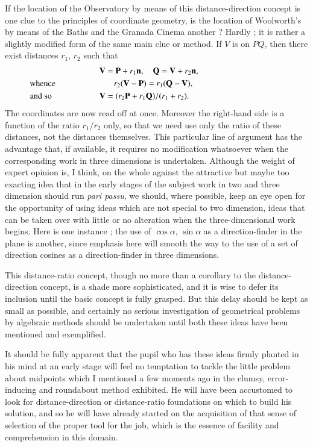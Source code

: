 If the location of the Observatory by means of this distance-direction
concept is one clue to the principles of coordinate geometry, is the
location of Woolworth's by means of the Baths and the Granada Cinema
another ? Hardly ; it is rather a slightly modified form\pageoriginale
of the same main clue or method. If $V$ is on $PQ$, then there exist
distances $r_1$, $r_2$ such that 
\begin{align*}
\bV & = \bP + r_1 \bn, \quad \bQ = \bV + r_2 \bn,\\
\text{whence } \hspace{2cm} & \quad r_2 (\bV - \bP) = r_1 (\bQ - \bV),
\hspace{3.8cm}\\
\text{and so } \hspace{1.9cm} \bV & = (r_2 \bP + r_1 \bQ) / (r_1 +
r_2). \hspace{3.5cm}
\end{align*}
The coordinates are now read off at once. Moreover the right-hand side
is a function of the ratio $r_1/r_2$ only, so that we need use only
the ratio of these distances, not the distances themselves. This
particular line of argument has the advantage that, if available, it
requires no modification whatsoever when the corresponding work in
three dimensions is undertaken. Although the weight of expert opinion
is, I think, on the whole against the attractive but maybe too
exacting idea that in the early stages of the subject work in two and
three dimension should run \textit{pari passu}, we should, where
possible, keep an eye open for the opportunity of using ideas which
are not special to two dimension, ideas that can be taken over with
little or no alteration when the three-dimensional work begins. Here
is one instance ; the use of $\cos \alpha$, $\sin \alpha$ as a
direction-finder in the plane is another, since emphasis here will
smooth the way to the use of a set of direction cosines as a
direction-finder in three dimensions.

This distance-ratio concept, though no more than a corollary to the
distance-direction concept, is a shade more sophisticated, and it is
wise to defer its inclusion until the basic concept is fully
grasped. But this delay should be kept as small as possible, and
certainly no serious investigation of geometrical problems by
algebraic methods should be undertaken until both these ideas have
been mentioned and exemplified.

It should be fully apparent that the pupil who has these ideas firmly
planted in his mind at an early stage will feel no temptation to
tackle the little problem about midpoints which I mentioned a few
moments ago in the clumsy, error- inducing and roundabout method
exhibited. He will have been accustomed to look for distance-direction\pageoriginale
or distance-ratio foundations on which to build his solution, and so
he will have already started on the acquisition of that sense of
selection of the proper tool for the job, which is the essence of
facility and comprehension in this domain. 

